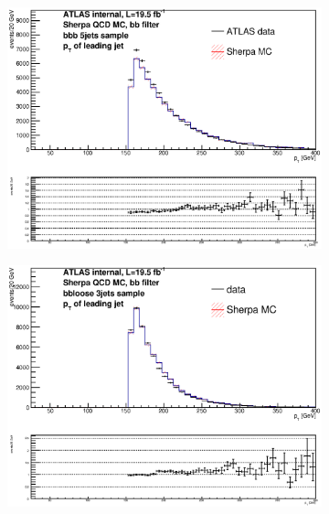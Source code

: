 \begin{figure}[phtb!]
\begin{center}
  \begin{subfigure}[$bbb$ 5+ jet category]{0.3\textwidth}\includegraphics[width=\textwidth]{MonteCarlo/figures/pt0_bbb_5jets.eps}\end{subfigure}
  \begin{subfigure}[$bbloose$ 3 jet category]{0.3\textwidth}\includegraphics[width=\textwidth]{MonteCarlo/figures/pt0_bbloose_3jets.eps}\end{subfigure}

\end{center}
\end{figure}
